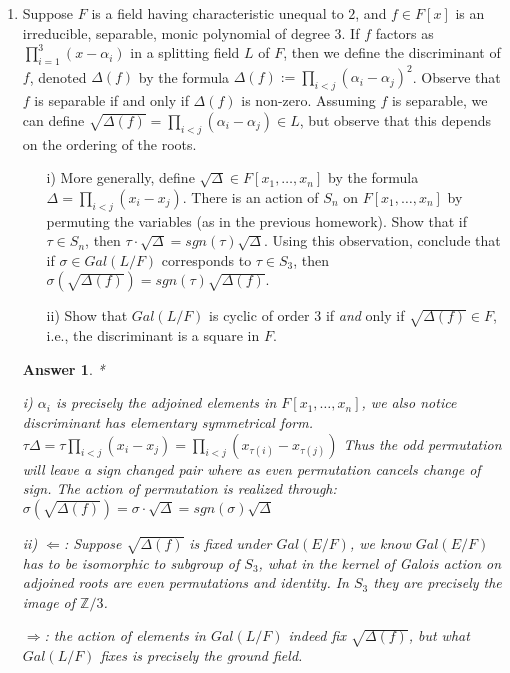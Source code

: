 \documentclass[11pt,leqno]{article}
\newcommand{\Z}{{\mathbb Z}}
\newcommand{\<}[1]{{\langle}#1 {\rangle}}
\theoremstyle{plain}
\newtheorem*{answer*}{Answer}
\theoremstyle{definition}
\theoremstyle{remark}
\numberwithin{equation}{section}
\begin{document}
\begin{enumerate}
\item Suppose $F$ is a field having characteristic unequal to $2$, and $f \in F[x]$ is an irreducible, separable, monic polynomial of degree $3$.  If $f$ factors as $\prod_{i=1}^3 (x - \alpha_i)$ in a splitting field $L$ of $F$, then we define the discriminant of $f$, denoted $\Delta(f)$ by the formula $\Delta(f) := \prod_{i < j} (\alpha_i - \alpha_j)^2$.  Observe that $f$ is separable if and only if $\Delta(f)$ is non-zero.  Assuming $f$ is separable, we can define $\sqrt{\Delta(f)} = \prod_{i < j} (\alpha_i - \alpha_j) \in L$, but observe that this depends on the ordering of the roots.
    \begin{itemize}
    \item[i)] More generally, define $\sqrt{\Delta} \in F[x_1,\ldots,x_n]$ by the formula $\Delta = \prod_{i < j}(x_i - x_j)$.  There is an action of $S_n$ on $F[x_1,\ldots,x_n]$ by permuting the variables (as in the previous homework).  Show that if $\tau \in S_n$, then $\tau \cdot \sqrt{\Delta} = sgn(\tau) \sqrt{\Delta}$.  Using this observation, conclude that if $\sigma \in Gal(L/F)$ corresponds to $\tau \in S_3$, then $\sigma(\sqrt{\Delta(f)}) = sgn(\tau) \sqrt{\Delta(f)}$.
    \item[ii)] Show that $Gal(L/F)$ is cyclic of order $3$ if \textit{and} only if $\sqrt{\Delta(f)} \in F$, i.e., the discriminant is a square in $F$.
    \end{itemize}
    
    \begin{answer*}*
    
    i) $\alpha_i$ is precisely the adjoined elements in $F[x_1,\ldots,x_n]$, we also notice discriminant has elementary symmetrical form. $\tau\Delta = \tau\prod_{i < j}(x_i - x_j)=\prod_{i < j}(x_{\tau(i)} - x_{\tau(j)})$ Thus the odd permutation will leave a sign changed pair where as even permutation cancels change of sign.  The action of permutation is realized through: $\sigma(\sqrt{\Delta(f)})=\sigma \cdot \sqrt{\Delta} = sgn(\sigma) \sqrt{\Delta}$
    
    ii) $\Leftarrow$: Suppose $\sqrt{\Delta(f)}$ is fixed under $Gal(E/F)$, we know $Gal(E/F)$ has to be isomorphic to subgroup of $S_3$, what in the kernel of Galois action on adjoined roots are even permutations and identity. In $S_3$ they are precisely the image of $\Z/3$.
    
    $\Rightarrow$: the action of elements in $Gal(L/F)$ indeed fix $\sqrt{\Delta(f)}$, but what $Gal(L/F)$ fixes is precisely the ground field. 
    \end{answer*}
    

\end{enumerate}
\end{document}
